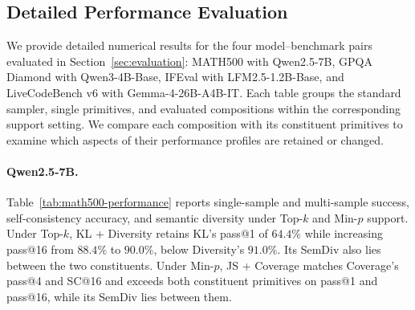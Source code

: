 \documentclass{article} %
\begin{document}
\subsection{Detailed Performance Evaluation}
\label{app:detailed-performance}
We provide detailed numerical results for the four model--benchmark pairs evaluated in Section~\ref{sec:evaluation}: MATH500 with Qwen2.5-7B, GPQA Diamond with Qwen3-4B-Base, IFEval with LFM2.5-1.2B-Base, and LiveCodeBench v6 with Gemma-4-26B-A4B-IT.
Each table groups the standard sampler, single primitives, and evaluated compositions within the corresponding support setting.
We compare each composition with its constituent primitives to examine which aspects of their performance profiles are retained or changed.

\paragraph{Qwen2.5-7B.}
Table~\ref{tab:math500-performance} reports single-sample and multi-sample success, self-consistency accuracy, and semantic diversity under Top-$k$ and Min-$p$ support.
Under Top-$k$, KL + Diversity retains KL's pass@1 of $64.4\%$ while increasing pass@16 from $88.4\%$ to $90.0\%$, below Diversity's $91.0\%$.
Its SemDiv also lies between the two constituents.
Under Min-$p$, JS + Coverage matches Coverage's pass@4 and SC@16 and exceeds both constituent primitives on pass@1 and pass@16, while its SemDiv lies between them.
\end{document}
